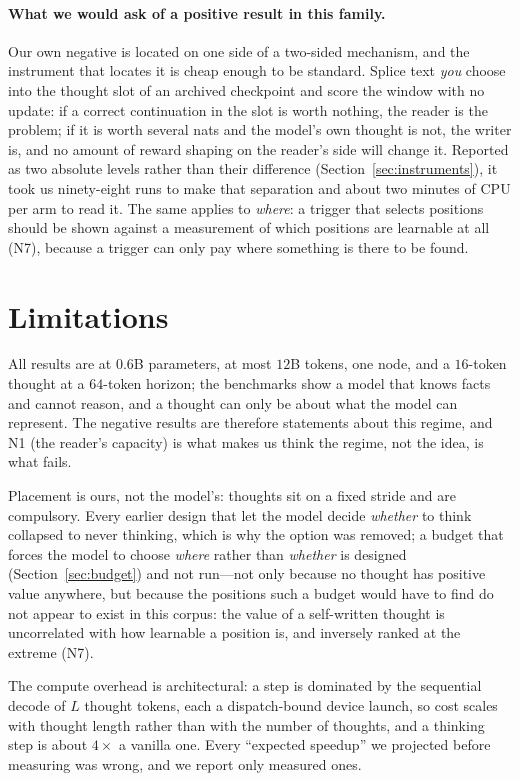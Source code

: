 \documentclass{article} %
\begin{document}
\paragraph{What we would ask of a positive result in this family.} Our own negative is located on one side of a two-sided mechanism, and the instrument that locates it is cheap enough to be standard. Splice text \emph{you} choose into the thought slot of an archived checkpoint and score the window with no update: if a correct continuation in the slot is worth nothing, the reader is the problem; if it is worth several nats and the model's own thought is not, the writer is, and no amount of reward shaping on the reader's side will change it. Reported as two absolute levels rather than their difference (Section~\ref{sec:instruments}), it took us ninety-eight runs to make that separation and about two minutes of CPU per arm to read it. The same applies to \emph{where}: a trigger that selects positions should be shown against a measurement of which positions are learnable at all (N7), because a trigger can only pay where something is there to be found.

\section{Limitations}

All results are at 0.6B parameters, at most $12$B tokens, one node, and a $16$-token thought at a $64$-token horizon; the benchmarks show a model that knows facts and cannot reason, and a thought can only be about what the model can represent. The negative results are therefore statements about this regime, and N1 (the reader's capacity) is what makes us think the regime, not the idea, is what fails.

Placement is ours, not the model's: thoughts sit on a fixed stride and are compulsory. Every earlier design that let the model decide \emph{whether} to think collapsed to never thinking, which is why the option was removed; a budget that forces the model to choose \emph{where} rather than \emph{whether} is designed (Section~\ref{sec:budget}) and not run---not only because no thought has positive value anywhere, but because the positions such a budget would have to find do not appear to exist in this corpus: the value of a self-written thought is uncorrelated with how learnable a position is, and inversely ranked at the extreme (N7).

The compute overhead is architectural: a step is dominated by the sequential decode of $L$ thought tokens, each a dispatch-bound device launch, so cost scales with thought length rather than with the number of thoughts, and a thinking step is about $4\times$ a vanilla one. Every ``expected speedup'' we projected before measuring was wrong, and we report only measured ones.
\end{document}

